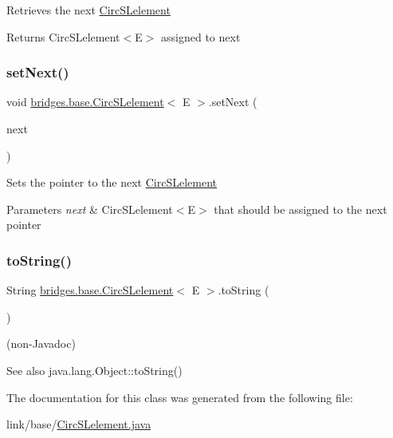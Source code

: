 Retrieves the next \hyperlink{classbridges_1_1base_1_1_circ_s_lelement}{Circ\+S\+Lelement}

\begin{DoxyReturn}{Returns}
Circ\+S\+Lelement$<$\+E$>$ assigned to next 
\end{DoxyReturn}
\hypertarget{classbridges_1_1base_1_1_circ_s_lelement_acb8e78195e80a243d0add9a5d281f01c}{}\label{classbridges_1_1base_1_1_circ_s_lelement_acb8e78195e80a243d0add9a5d281f01c} 
\subsubsection{\texorpdfstring{set\+Next()}{setNext()}}
{\footnotesize\ttfamily void \hyperlink{classbridges_1_1base_1_1_circ_s_lelement}{bridges.\+base.\+Circ\+S\+Lelement}$<$ E $>$.set\+Next (\begin{DoxyParamCaption}\item[{\hyperlink{classbridges_1_1base_1_1_circ_s_lelement}{Circ\+S\+Lelement}$<$ E $>$}]{next }\end{DoxyParamCaption})}

Sets the pointer to the next \hyperlink{classbridges_1_1base_1_1_circ_s_lelement}{Circ\+S\+Lelement}


\begin{DoxyParams}{Parameters}
{\em next} & Circ\+S\+Lelement$<$\+E$>$ that should be assigned to the next pointer \\
\hline
\end{DoxyParams}
\hypertarget{classbridges_1_1base_1_1_circ_s_lelement_af307188926766e73efb988f102ce9740}{}\label{classbridges_1_1base_1_1_circ_s_lelement_af307188926766e73efb988f102ce9740} 
\subsubsection{\texorpdfstring{to\+String()}{toString()}}
{\footnotesize\ttfamily String \hyperlink{classbridges_1_1base_1_1_circ_s_lelement}{bridges.\+base.\+Circ\+S\+Lelement}$<$ E $>$.to\+String (\begin{DoxyParamCaption}{ }\end{DoxyParamCaption})}

(non-\/\+Javadoc)

\begin{DoxySeeAlso}{See also}
java.\+lang.\+Object\+::to\+String() 
\end{DoxySeeAlso}


The documentation for this class was generated from the following file\+:\begin{DoxyCompactItemize}
\item 
link/base/\hyperlink{_circ_s_lelement_8java}{Circ\+S\+Lelement.\+java}\end{DoxyCompactItemize}
